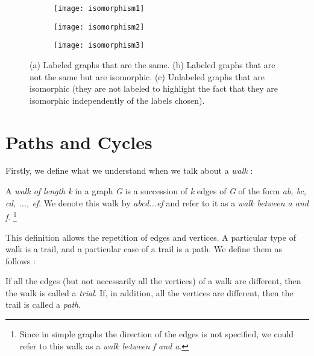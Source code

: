 \begin{figure}
	\centering
	\begin{subfigure}[b]{0.8\textwidth}
		\centering
		\texttt{[image: isomorphism1]}
		\caption{}
		\label{fig:iso1}
	\end{subfigure}
	\hfill
	\begin{subfigure}[b]{0.8\textwidth}
		\centering
		\texttt{[image: isomorphism2]}
		\caption{}
		\label{fig:iso2}
	\end{subfigure}
	\begin{subfigure}[b]{0.8\textwidth}
		\centering
		\texttt{[image: isomorphism3]}
		\caption{}
		\label{fig:iso3}
	\end{subfigure}
	\caption[Isomorphic graphs.]{(a) Labeled graphs that are the same. (b) Labeled graphs that are not the same but are isomorphic. (c) Unlabeled graphs that are isomorphic (they are not labeled to highlight the fact that they are isomorphic independently of the labels chosen).}
	\label{fig:isomorphic}
\end{figure}

\section{Paths and Cycles}

Firstly, we define what we understand when we talk about a \textit{walk} \cite{wilsonwatkins}:

\begin{defn}
        A \textit{walk of length k} in a graph \textit{G} is a succession of \textit{k} edges of \textit{G} of the form \textit{ab, bc, cd, ..., ef}. We denote this walk by \textit{abcd...ef} and refer to it as a \textit{walk between a and f}. \footnote{Since in simple graphs the direction of the edges is not specified, we could refer to this walk as a \textit{walk between f and a}.}
\end{defn}

This definition allows the repetition of edges and vertices. A particular type of walk is a trail, and a particular case of a trail is a path. We define them as follows \cite{wilsonwatkins}:

\begin{defn}
        If all the edges (but not necessarily all the vertices) of a walk are different, then the walk is called a 
        \textit{trial}. If, in addition, all the vertices are different, then the trail is called a \textit{path}.
\end{defn}

